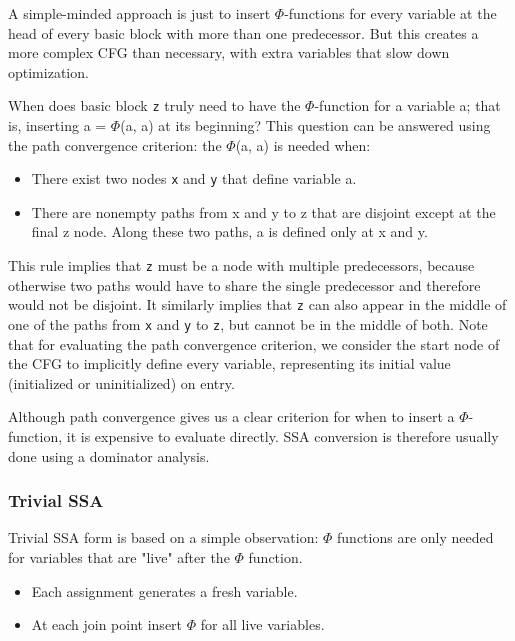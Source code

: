 A simple-minded approach is just to insert $\Phi$-functions for every variable at the head of every basic
block with more than one predecessor. But this creates a more complex CFG than necessary, with extra
variables that slow down optimization.

When does basic block \texttt{z} truly need to have the $\Phi$-function for a variable a; that is, inserting a = $\Phi$(a, a)
at its beginning? This question can be answered using the path convergence criterion: the $\Phi$(a, a) is needed
when:


\begin{itemize}
\item There exist two nodes \texttt{x} and \texttt{y} that define variable a.
\item There are nonempty paths from x and y to z that are disjoint except at the final z node. Along these
two paths, a is defined only at x and y.
\end{itemize}


This rule implies that \texttt{z} must be a node with multiple predecessors, because otherwise two paths would
have to share the single predecessor and therefore would not be disjoint. It similarly implies that \texttt{z} can also
appear in the middle of one of the paths from \texttt{x} and \texttt{y} to \texttt{z}, but cannot be in the middle of both.
Note that for evaluating the path convergence criterion, we consider the start node of the CFG to implicitly define every variable, 
representing its initial value (initialized or uninitialized) on entry.

Although path convergence gives us a clear criterion for when to insert a $\Phi$-function, it is expensive to
evaluate directly. SSA conversion is therefore usually done using a dominator analysis.



\subsubsection{Trivial SSA}

Trivial SSA form is based on a simple observation: $\Phi$ functions are only needed for variables that are "live" after the $\Phi$ function.

\begin{itemize}
	\item Each assignment generates a fresh variable.
	\item At each join point insert $\Phi$ for all live variables.
\end{itemize}


